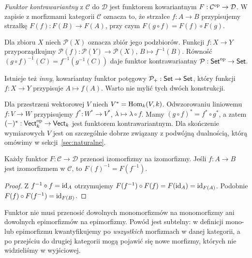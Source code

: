 \begin{definicja}
\emph{Funktor kontrawariantny} z $\mathcal C$ do $\mathcal D$ jest funktorem kowariantnym $F:\mathcal C^{\mathrm{op}}\to\mathcal D$. W zapisie z morfizmami kategorii $\mathcal C$ oznacza to, że strzałce $f:A\to B$ przypisujemy strzałkę $F(f):F(B)\to F(A)$, przy czym $F(g\circ f)=F(f)\circ F(g)$.
\end{definicja}

\begin{przyklad}[Przeciwobraz]
Dla zbioru $X$ niech $\mathcal P(X)$ oznacza zbiór jego podzbiorów. Funkcji $f:X\to Y$ przyporządkujmy $\mathcal P(f):\mathcal P(Y)\to\mathcal P(X)$, $B\mapsto f^{-1}(B)$. Równość $(g\circ f)^{-1}(C)=f^{-1}(g^{-1}(C))$ daje funktor kontrawariantny $\mathcal P:\mathsf{Set}^{\mathrm{op}}\to\mathsf{Set}$.

Istnieje też \emph{inny}, kowariantny funktor potęgowy $\mathcal P_+:\mathsf{Set}\to\mathsf{Set}$, który funkcji $f:X\to Y$ przypisuje $A\mapsto f(A)$. Warto nie mylić tych dwóch konstrukcji.
\end{przyklad}

\begin{przyklad}\label{przyklad:dualny}
Dla przestrzeni wektorowej $V$ niech $V^*=\operatorname{Hom}_k(V,k)$. Odwzorowaniu liniowemu $f:V\to W$ przypisujemy $f^*:W^*\to V^*$, $\lambda\mapsto\lambda\circ f$. Mamy $(g\circ f)^*=f^*\circ g^*$, a zatem $(-)^*:\mathsf{Vect}_k^{\mathrm{op}}\to\mathsf{Vect}_k$ jest funktorem kontrawariantnym. Dla skończenie wymiarowych $V$ jest on szczególnie dobrze związany z podwójną dualnością, którą omówimy w sekcji~\ref{sec:naturalne}.
\end{przyklad}

\begin{stwierdzenie}\label{tw:funktory-iso}
Każdy funktor $F:\mathcal C\to\mathcal D$ przenosi izomorfizmy na izomorfizmy. Jeśli $f:A\to B$ jest izomorfizmem w $\mathcal C$, to $F(f)^{-1}=F(f^{-1})$.
\end{stwierdzenie}
\begin{proof}
Z $f^{-1}\circ f=\mathrm{id}_A$ otrzymujemy $F(f^{-1})\circ F(f)=F(\mathrm{id}_A)=\mathrm{id}_{F(A)}$. Podobnie $F(f)\circ F(f^{-1})=\mathrm{id}_{F(B)}$.
\end{proof}

\begin{uwaga}
Funktor nie musi przenosić dowolnych monomorfizmów na monomorfizmy ani dowolnych epimorfizmów na epimorfizmy. Powód jest subtelny: w definicji mono- lub epimorfizmu kwantyfikujemy po \emph{wszystkich} morfizmach w danej kategorii, a po przejściu do drugiej kategorii mogą pojawić się nowe morfizmy, których nie widzieliśmy w wyjściowej.
\end{uwaga}

